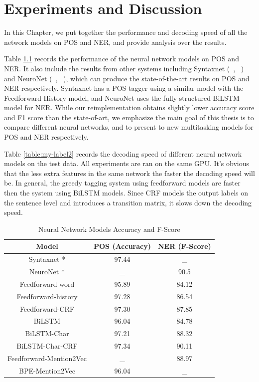 \documentclass{sfuthesis}
\begin{document}
\chapter{Experiments and Discussion}

In this Chapter, we put together the performance and decoding speed of all the network models on POS and NER, and provide analysis over the results.

Table \ref{table:my-label1} records the performance of the neural network models on POS and NER. It also include the results from other systems including Syntaxnet (~\citeauthor{alberti2017syntaxnet}, ~\citeyear{alberti2017syntaxnet}) and NeuroNet (~\citeauthor{2017neuroner}, ~\citeyear{2017neuroner}), which can produce the state-of-the-art results on POS and NER respectively. Syntaxnet has a POS tagger using a similar model with the Feedforward-History model, and NeuroNet uses the fully structured BiLSTM model for NER. While our reimplementation obtains slightly lower accuracy score and F1 score than the state-of-art, we emphasize the main goal of this thesis is to compare different neural networks, and to present to new multitasking models for POS and NER respectively.

Table \ref{table:my-label2} records the decoding speed of different neural network models on the test data. All experiments are ran on the same GPU. It's obvious that the less extra features in the same network the faster the decoding speed will be. In general, the greedy tagging system using feedforward models are faster then the system using BiLSTM models. Since CRF models the output labels on the sentence level and introduces a transition matrix, it slows down the decoding speed.

\begin{table}[]
\centering
\caption{Neural Network Models Accuracy and F-Score}
\label{table:my-label1}
\begin{tabular}{|c|c|c|}
\hline
Model         & POS (Accuracy)  & NER (F-Score)       \\ \hline
Syntaxnet \**    & 97.44         &   _     \\ \hline
NeuroNet \**    & _    & 90.5                \\ \hline 
Feedforward-word    & 95.89          &   84.12     \\ \hline
Feedforward-history & 97.28     & 86.54        \\ \hline
Feedforward-CRF     & 97.30          &   87.85     \\ \hline
BiLSTM  & 96.04     & 84.78                             \\ \hline
BiLSTM-Char & 97.21 & 88.32             \\ \hline
BiLSTM-Char-CRF & 97.34  & 90.11             \\ \hline
Feedforward-Mention2Vec  & _    & 88.97                       \\ \hline
BPE-Mention2Vec & 96.04     &  _   \\ \hline   
\end{tabular}
\end{table}
\end{document}
